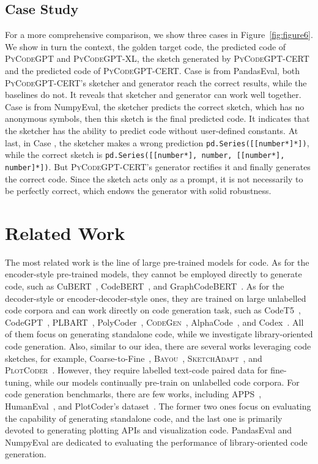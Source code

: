 \documentclass{article}
\newcommand{\cert}{\textsc{CERT}\xspace}
\newcommand{\peval}{PandasEval\xspace}
\newcommand{\neval}{NumpyEval\xspace}
\newcommand{\codepy}{\textsc{PyCodeGPT}\xspace}
\newcommand{\codepyxl}{\textsc{PyCodeGPT}-XL\xspace}
\newcommand{\codegen}{\textsc{CodeGen}\xspace}
\begin{document}
\subsection{Case Study}\label{casestudy}
For a more comprehensive comparison, we show three cases in Figure~\ref{fig:figure6}. We show in turn the context, the golden target code, the predicted code of \codepy and \codepyxl, the sketch generated by \codepy-\cert and the predicted code of \codepy-\cert. Case  is from \peval, both \codepy-\cert's sketcher and generator reach the correct results, while the baselines do not. It reveals that sketcher and generator can work well together. Case  is from \neval, the sketcher predicts the correct sketch, which has no anonymous symbols, then this sketch is the final predicted code. It indicates that the sketcher has the ability to predict code without user-defined constants. At last, in Case , the sketcher makes a wrong prediction {\small\texttt{pd.Series([[number*]*])}}, while the correct sketch is {\small\texttt{pd.Series([[number*], number, [[number*], number]*])}}. But \codepy-\cert's generator rectifies it and finally generates the correct code. Since the sketch acts only as a prompt, it is not necessarily to be perfectly correct, which endows the generator with solid robustness.

\section{Related Work}
The most related work is the line of large pre-trained models for code. As for the encoder-style pre-trained models, they cannot be employed directly to generate code, such as CuBERT~\cite{kanade2020learning}, CodeBERT~\cite{feng2020codebert}, and GraphCodeBERT~\cite{guo2020graphcodebert}. As for the decoder-style or encoder-decoder-style ones, they are trained on large unlabelled code corpora and can work directly on code generation task, such as CodeT5~\cite{wang2021codet5}, CodeGPT~\cite{lu2021codexglue}, PLBART~\cite{ahmad-etal-2021-unified}, PolyCoder~\cite{xu2022PolyCoder}, \codegen~\cite{nijkamp2022conversational}, AlphaCode~\cite{li2022competition}, and Codex~\cite{chen2021evaluating}.
All of them focus on generating standalone code, while we investigate library-oriented code generation. Also, similar to our idea, there are several works leveraging code sketches, for example, Coarse-to-Fine~\cite{dong2018coarse}, \textsc{Bayou}~\cite{murali2017neural}, \textsc{SketchAdapt}~\cite{nye2019learning}, and \textsc{PlotCoder}~\cite{chen2021plotcoder}. 
However, they require labelled text-code paired data for fine-tuning, while our models continually pre-train on unlabelled code corpora.
For code generation benchmarks, there are few works, including APPS~\cite{hendrycks2021measuring}, HumanEval~\cite{chen2021evaluating}, and PlotCoder's dataset~\cite{chen2021plotcoder}. The former two ones focus on evaluating the capability of generating standalone code, and the last one is primarily devoted to generating plotting APIs and visualization code. \peval and \neval are dedicated to evaluating the performance of library-oriented code generation.
\end{document}
